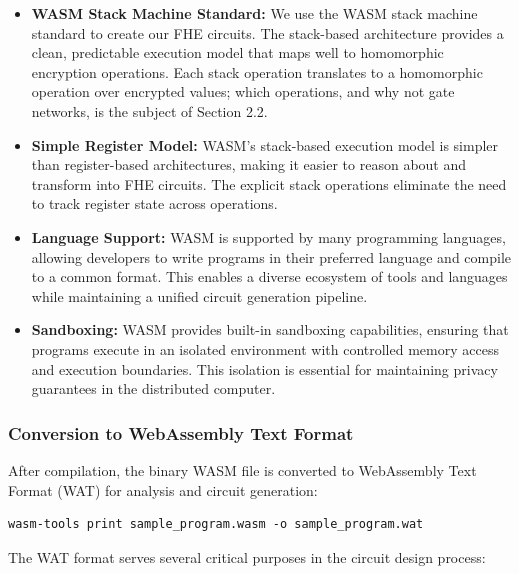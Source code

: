 \documentclass[12pt,a4paper]{article}
\begin{document}
\begin{itemize}
    \item \textbf{WASM Stack Machine Standard:} We use the WASM stack machine standard to create our FHE circuits.
    The stack-based architecture provides a clean, predictable execution model that maps well to homomorphic encryption operations.
    Each stack operation translates to a homomorphic operation over encrypted values; which operations, and why not gate networks, is the subject of Section 2.2.

    \item \textbf{Simple Register Model:} WASM's stack-based execution model is simpler than register-based architectures, making it easier to reason about and transform into FHE circuits.
    The explicit stack operations eliminate the need to track register state across operations.

    \item \textbf{Language Support:} WASM is supported by many programming languages, allowing developers to write programs in their preferred language and compile to a common format.
    This enables a diverse ecosystem of tools and languages while maintaining a unified circuit generation pipeline.

    \item \textbf{Sandboxing:} WASM provides built-in sandboxing capabilities, ensuring that programs execute in an isolated environment with controlled memory access and execution boundaries.
    This isolation is essential for maintaining privacy guarantees in the distributed computer.
\end{itemize}

\subsubsection{Conversion to WebAssembly Text Format}

After compilation, the binary WASM file is converted to WebAssembly Text Format (WAT) for analysis and circuit generation:

\begin{verbatim}
wasm-tools print sample_program.wasm -o sample_program.wat
\end{verbatim}

The WAT format serves several critical purposes in the circuit design process:
\end{document}
